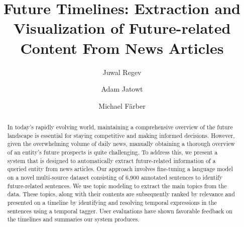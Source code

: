 \documentclass[sigconf]{acmart}
\begin{document}
\newcommand{\listofcustomfloats}{\listof{customfloat}{List of Custom Floats}}

\title{Future Timelines: Extraction and Visualization of Future-related Content  From News Articles}

\author{Juwal Regev}

\author{Adam Jatowt}

\author{Michael Färber}



\begin{abstract}
In today's rapidly evolving world, maintaining a comprehensive overview of the future landscape is essential for staying competitive and making informed decisions. However, given the overwhelming volume of daily news, manually obtaining a thorough overview of an entity's future prospects is quite challenging. To address this, we present a system that is designed to automatically extract future-related information of a queried entity from news articles. Our approach involves fine-tuning a language model on a novel multi-source dataset consisting of 6,900 annotated sentences to identify future-related sentences. We use topic modeling to extract the main topics from the data. These topics, along with their contents are subsequently ranked by relevance and presented on a timeline by identifying and resolving temporal expressions in the sentences using a temporal tagger. User evaluations have shown favorable feedback on the timelines and summaries our system produces.
\end{abstract}
\end{document}
